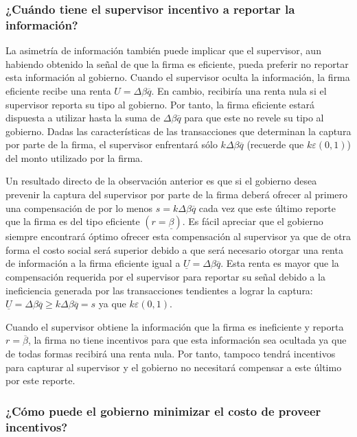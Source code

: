 \documentclass[
  12pt,
  spanish,
]{book}
\begin{document}
\hypertarget{cuuxe1ndo-tiene-el-supervisor-incentivo-a-reportar-la-informaciuxf3n}{%
\subsubsection{¿Cuándo tiene el supervisor incentivo a reportar la
información?}\label{cuuxe1ndo-tiene-el-supervisor-incentivo-a-reportar-la-informaciuxf3n}}

La asimetría de información también puede implicar que el supervisor,
aun habiendo obtenido la señal de que la firma es eficiente, pueda
preferir no reportar esta información al gobierno. Cuando el supervisor
oculta la información, la firma eficiente recibe una renta
\(U = Δ\beta \overline q\). En cambio, recibiría una renta nula si el
supervisor reporta su tipo al gobierno. Por tanto, la firma eficiente
estará dispuesta a utilizar hasta la suma de \(Δ\beta \overline q\) para
que este no revele su tipo al gobierno. Dadas las características de las
transacciones que determinan la captura por parte de la firma, el
supervisor enfrentará sólo \(k Δ\beta \overline q\) (recuerde que
\(k ε (0,1)\)) del monto utilizado por la firma.

Un resultado directo de la observación anterior es que si el gobierno
desea prevenir la captura del supervisor por parte de la firma deberá
ofrecer al primero una compensación de por lo menos
\(s = k Δ\beta \overline q\) cada vez que este último reporte que la
firma es del tipo eficiente \((r = \underline β)\). Es fácil apreciar
que el gobierno siempre encontrará óptimo ofrecer esta compensación al
supervisor ya que de otra forma el costo social será superior debido a
que será necesario otorgar una renta de información a la firma eficiente
igual a \(\underline U = Δβ \overline q\). Esta renta es mayor que la
compensación requerida por el supervisor para reportar su señal debido a
la ineficiencia generada por las transacciones tendientes a lograr la
captura: \(\underline U = Δβ \overline q \geq kΔβ \overline q = s\) ya
que \(k ε (0,1)\).

Cuando el supervisor obtiene la información que la firma es ineficiente
y reporta \(r = \overline β\), la firma no tiene incentivos para que
esta información sea ocultada ya que de todas formas recibirá una renta
nula. Por tanto, tampoco tendrá incentivos para capturar al supervisor y
el gobierno no necesitará compensar a este último por este reporte.

\hypertarget{cuxf3mo-puede-el-gobierno-minimizar-el-costo-de-proveer-incentivos}{%
\subsubsection{¿Cómo puede el gobierno minimizar el costo de proveer
incentivos?}\label{cuxf3mo-puede-el-gobierno-minimizar-el-costo-de-proveer-incentivos}}
\end{document}

